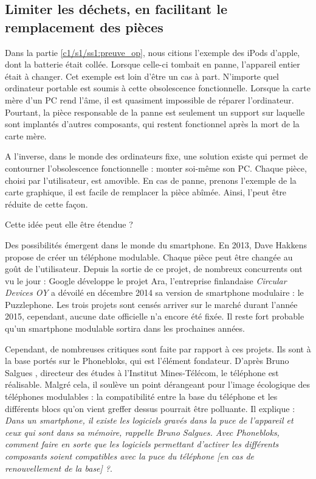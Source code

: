 \subsection{Limiter les déchets, en facilitant le remplacement des pièces }

Dans la partie \ref{c1/s1/ss1:preuve_op}, nous citions l'exemple des iPods d'apple, dont la batterie était collée. Lorsque celle-ci tombait en panne,  l'appareil entier était à changer. 
Cet exemple est loin d'être un cas à part. N'importe quel ordinateur portable est soumis à cette obsolescence fonctionnelle. Lorsque la carte mère d'un PC rend l'âme, il est quasiment impossible de réparer l'ordinateur. Pourtant, la pièce responsable de la panne est seulement un support sur laquelle sont implantés d'autres composants, qui restent fonctionnel après la mort de la carte mère.  

A l'inverse, dans le monde des ordinateurs fixe, une solution existe qui permet de contourner l'obsolescence fonctionnelle : monter soi-même son PC. Chaque pièce, choisi par l'utilisateur, est amovible. En cas de panne, prenons l'exemple de la carte graphique, il est facile de remplacer la pièce abîmée. Ainsi, l'\op peut être réduite de cette façon. 


Cette idée peut elle être étendue ? 

\bigbreak

Des possibilités émergent dans le monde du smartphone. En 2013, Dave Hakkens propose de créer un téléphone modulable. Chaque pièce peut être changée au goût de l'utilisateur. Depuis la sortie de ce projet, de nombreux concurrents ont vu le jour : Google développe le projet Ara,  l'entreprise finlandaise \textit{Circular Devices OY} a dévoilé en décembre 2014 sa version de smartphone modulaire : le Puzzlephone. Les trois projets sont censés arriver sur le marché durant l'année 2015, cependant, aucune date officielle n'a encore été fixée. Il reste fort probable qu'un smartphone modulable sortira dans les prochaines années. 

Cependant, de nombreuses critiques sont faite par rapport à ces projets. Ils sont à la base portés sur le Phonebloks, qui est l'élément fondateur. D'après  Bruno Salgues \cite{phonebloks_critiques} , directeur des études à l'Institut Mines-Télécom, le téléphone est réalisable. Malgré cela, il soulève un point  dérangeant pour l'image écologique des téléphones modulables : la compatibilité entre la base du téléphone et les différents blocs qu'on vient greffer dessus pourrait être polluante. Il explique : \og{}\textit{Dans un smartphone, il existe les logiciels gravés dans la puce de l’appareil et ceux qui sont dans sa mémoire, rappelle Bruno Salgues. Avec Phonebloks, comment faire en sorte que les logiciels permettant d'activer les différents composants soient compatibles avec la puce du téléphone [en cas de renouvellement de la base] ?}\fg{}. 

